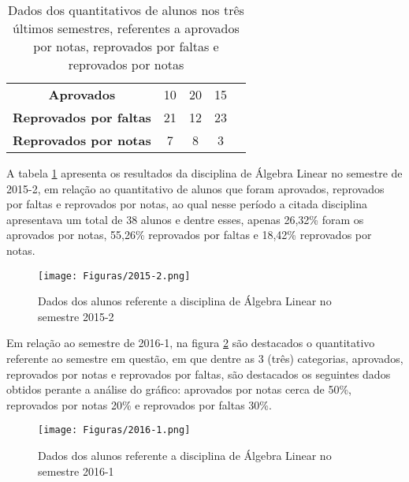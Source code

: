 \begin{table}[!htp]
\begin{tabular}{lcccl}
\multicolumn{1}{|c|}{\cellcolor[HTML]{EFEFEF}\textbf{Aprovados}}            & \multicolumn{1}{c|}{\cellcolor[HTML]{EFEFEF}10}              & \multicolumn{1}{c|}{\cellcolor[HTML]{EFEFEF}20}              & \multicolumn{1}{c|}{\cellcolor[HTML]{EFEFEF}15}              &  \\ \cline{1-4}
\multicolumn{1}{|c|}{\textbf{Reprovados por faltas}}                        & \multicolumn{1}{c|}{21}                                      & \multicolumn{1}{c|}{12}                                      & \multicolumn{1}{c|}{23}                                      &  \\ \cline{1-4}
\multicolumn{1}{|c|}{\cellcolor[HTML]{EFEFEF}\textbf{Reprovados por notas}} & \multicolumn{1}{c|}{\cellcolor[HTML]{EFEFEF}7}               & \multicolumn{1}{c|}{\cellcolor[HTML]{EFEFEF}8}               & \multicolumn{1}{c|}{\cellcolor[HTML]{EFEFEF}3}               &  \\ \cline{1-4}
\end{tabular}
    \caption{Dados dos quantitativos de alunos nos três últimos semestres, referentes a aprovados por notas, reprovados por faltas e reprovados por notas}
    \label{dados_tres_semestres_alunos_algebra}
\end{table}

A tabela \ref{algebra_linear_2015_2} apresenta os resultados da disciplina de Álgebra Linear no semestre de 2015-2, em relação ao quantitativo de alunos que foram aprovados, reprovados por faltas e reprovados por notas, ao qual nesse período a citada disciplina apresentava um total de 38 alunos e dentre esses, apenas 26,32\% foram os aprovados por notas, 55,26\% reprovados por faltas e 18,42\% reprovados por notas.

\begin{figure}[!htb]
  \centering 
  \texttt{[image: Figuras/2015-2.png]}
  \caption{Dados dos alunos referente a disciplina de Álgebra Linear no semestre 2015-2}\label{algebra_linear_2015_2}
\end{figure}

Em relação ao semestre de 2016-1, na figura \ref{algebra_linear_2016_1} são destacados o quantitativo referente ao semestre em questão, em que dentre as 3 (três) categorias, aprovados, reprovados por notas e reprovados por faltas, são destacados os seguintes dados obtidos perante a análise do gráfico: aprovados por notas cerca de 50\%, reprovados por notas 20\% e reprovados por faltas 30\%.

\begin{figure}[!htb]
  \centering 
  \texttt{[image: Figuras/2016-1.png]}
  \caption{Dados dos alunos referente a disciplina de Álgebra Linear no semestre 2016-1}\label{algebra_linear_2016_1}
\end{figure}

